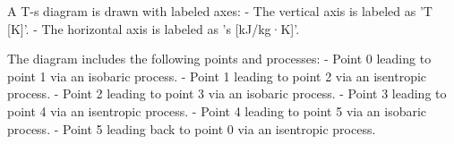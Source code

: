 A T-s diagram is drawn with labeled axes:  
- The vertical axis is labeled as 'T [K]'.  
- The horizontal axis is labeled as 's [kJ/kg·K]'.  

The diagram includes the following points and processes:  
- Point 0 leading to point 1 via an isobaric process.  
- Point 1 leading to point 2 via an isentropic process.  
- Point 2 leading to point 3 via an isobaric process.  
- Point 3 leading to point 4 via an isentropic process.  
- Point 4 leading to point 5 via an isobaric process.  
- Point 5 leading back to point 0 via an isentropic process.